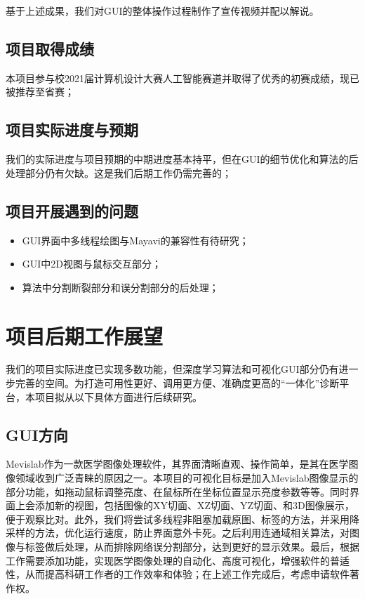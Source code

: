 \documentclass[lang=cn,11pt,a4paper,cite=numbers]{elegantpaper}
\begin{document}
基于上述成果，我们对GUI的整体操作过程制作了宣传视频并配以解说。

\subsection{项目取得成绩}
本项目参与校2021届计算机设计大赛人工智能赛道并取得了优秀的初赛成绩，现已被推荐至省赛；

\subsection{项目实际进度与预期}
我们的实际进度与项目预期的中期进度基本持平，但在GUI的细节优化和算法的后处理部分仍有欠缺。这是我们后期工作仍需完善的；

\subsection{项目开展遇到的问题}

\begin{itemize}
    \item GUI界面中多线程绘图与Mayavi的兼容性有待研究；
    \item GUI中2D视图与鼠标交互部分；
    \item 算法中分割断裂部分和误分割部分的后处理；
\end{itemize}

\section{项目后期工作展望}

我们的项目实际进度已实现多数功能，但深度学习算法和可视化GUI部分仍有进一步完善的空间。为打造可用性更好、调用更方便、准确度更高的“一体化”诊断平台，本项目拟从以下具体方面进行后续研究。

\subsection{GUI方向}

Mevislab作为一款医学图像处理软件，其界面清晰直观、操作简单，是其在医学图像领域收到广泛青睐的原因之一。本项目的可视化目标是加入Mevislab图像显示的部分功能，如拖动鼠标调整亮度、在鼠标所在坐标位置显示亮度参数等等。同时界面上会添加新的视图，包括图像的XY切面、XZ切面、YZ切面、和3D图像展示，便于观察比对。此外，我们将尝试多线程非阻塞加载原图、标签的方法，并采用降采样的方法，优化运行速度，防止界面意外卡死。之后利用连通域相关算法，对图像与标签做后处理，从而排除网络误分割部分，达到更好的显示效果。最后，根据工作需要添加功能，实现医学图像处理的自动化、高度可视化，增强软件的普适性，从而提高科研工作者的工作效率和体验；在上述工作完成后，考虑申请软件著作权。
\end{document}

